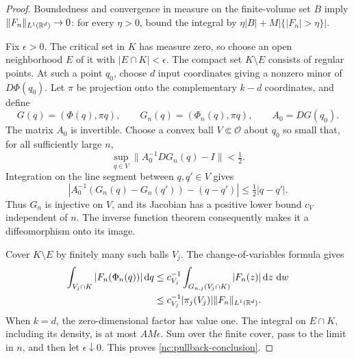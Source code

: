 \begin{proof}
Boundedness and convergence in measure on the finite-volume set
\(B\) imply \(\|F_n\|_{L^1(\mathbb R^d)}\to0\): for every
\(\eta>0\), bound the integral by
\(\eta|B|+M|\{|F_n|>\eta\}|\).

Fix \(\epsilon>0\).  The critical set in \(K\) has measure zero,
so choose an open neighborhood \(E\) of it with
\(|E\cap K|<\epsilon\).  The compact set \(K\setminus E\)
consists of regular points.  At such a point \(q_0\), choose \(d\)
input coordinates giving a nonzero minor of \(D\Phi(q_0)\).
Let \(\pi\) be projection onto the complementary \(k-d\)
coordinates, and define
\[
 G(q)=(\Phi(q),\pi q),\qquad
 G_n(q)=(\Phi_n(q),\pi q),\qquad A_0=DG(q_0).
\]
The matrix \(A_0\) is invertible.  Choose a convex ball
\(V\Subset\mathcal O\) about \(q_0\) so small that, for all
sufficiently large \(n\),
\[
 \sup_{q\in V}\|A_0^{-1}DG_n(q)-I\|<\tfrac12.
\]
Integration on the line segment between \(q,q'\in V\) gives
\[
 |A_0^{-1}(G_n(q)-G_n(q'))-(q-q')|
 \le\tfrac12|q-q'|.
\]
Thus \(G_n\) is injective on \(V\), and its Jacobian has a
positive lower bound \(c_V\) independent of \(n\).  The inverse
function theorem consequently makes it a diffeomorphism onto
its image.

Cover \(K\setminus E\) by finitely many such balls \(V_j\).
The change-of-variables formula gives
\[
 \begin{split}
 \int_{V_j\cap K}|F_n(\Phi_n(q))|\,\mathrm d q
 &\le c_{V_j}^{-1}
       \int_{G_{n,j}(V_j\cap K)}|F_n(z)|\,\mathrm d z\,\,\mathrm d w\\
 &\le c_{V_j}^{-1}|\pi_j(V_j)|
       \|F_n\|_{L^1(\mathbb R^d)}.
 \end{split}
\]
When \(k=d\), the zero-dimensional factor has value one.
The integral on \(E\cap K\), including its density, is at most
\(AM\epsilon\).  Sum over the finite cover, pass to the limit in
\(n\), and then let \(\epsilon\downarrow0\).
This proves \eqref{nc:pullback-conclusion}.
\end{proof}

